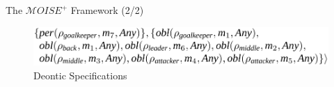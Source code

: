\documentclass[9pt, aspectratio=169]{beamer}
\begin{document}
\begin{frame}{The $\mathcal{M}OISE^+$ Framework (2/2)}
  \ \\

  \begin{minipage}{\textwidth}
    \centering
    \begin{figure}[H]
      \centering
      \includegraphics[width=0.4\linewidth]{figures/soccer_ds.png}
      \caption*{Deontic Specifications}
    \end{figure}
  \end{minipage}

\end{frame}




\end{document}
